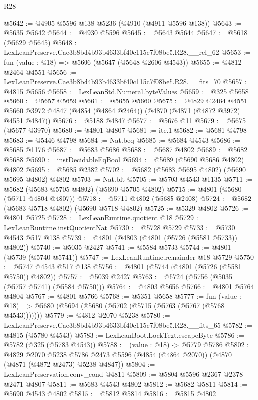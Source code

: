 \begin{lexlean}{R28}
\begin{coremodule}
@5642 := @4905 @5596 @138 @5236 (@4910 (@4911 @5596 @138))
@5643 := @5635 @5642
@5644 := @4930 @5596
@5645 := @5643 @5644
@5647 := @5618 (@5629 @5645)
@5648 := LexLeanPreserve.Cae3b8bd4b93b4633bf40c115c7f08be5.R28.__rel_62
@5653 := fun (value : @18) => @5606 (@5647 (@5648 @2606 @4543))
@5655 := @4812 @2464 @4551
@5656 := LexLeanPreserve.Cae3b8bd4b93b4633bf40c115c7f08be5.R28.__fits_70
@5657 := @4815 @5656
@5658 := LexLeanStd.Numeral.byteValues
@5659 := @325 @5658
@5660 := @5657 @5659
@5661 := @5655 @5660
@5675 := @4829
    @2464
    @4551
    @5660
    @3972
    @4847
    (@4854 (@4864 @2464))
    (@4870 (@4871 (@4872 @3972) @4551 @4847))
@5676 := @5188 @4847
@5677 := @5676 @11
@5679 := @5675 (@5677 @3970)
@5680 := @4801 @4807
@5681 := ite.{1}
@5682 := @5681 @4798
@5683 := @5446 @4798
@5684 := Nat.beq
@5685 := @5684 @4543
@5686 := @5685 @1176
@5687 := @5683 @5686
@5688 := @5687 @4802
@5689 := @5682 @5688
@5690 := instDecidableEqBool
@5694 := @5689 (@5690 @5686 @4802) @4802
@5695 := @5685 @2382
@5702 := @5682 (@5683 @5695 @4802) (@5690 @5695 @4802) @4802
@5703 := Nat.blt
@5705 := @5703 @4543 @1135
@5711 := @5682 (@5683 @5705 @4802) (@5690 @5705 @4802)
@5715 := @4801 (@5680 (@5711 @4804 @4807))
@5718 := @5711 @4802 (@5685 @2408)
@5724 := @5682 (@5683 @5718 @4802) (@5690 @5718 @4802)
@5725 := @5329 @4802
@5726 := @4801 @5725
@5728 := LexLeanRuntime.quotient @18
@5729 := LexLeanRuntime.instQuotientNat
@5730 := @5728 @5729
@5733 := @5730 @4543 @517 @138
@5739 := @4801 (@4803 (@4801 (@5726 (@5581 @5733)) @4802))
@5740 := @5035 @2427
@5741 := @5584 @5733
@5744 := @4801 (@5739 (@5740 @5741))
@5747 := LexLeanRuntime.remainder @18 @5729
@5750 := @5747 @4543 @517 @138
@5756 := @4801 (@5744 (@4801 (@5726 (@5581 @5750)) @4802))
@5757 := @5039 @2427
@5763 := @5724 (@5756 (@5035 (@5757 @5741) (@5584 @5750)))
@5764 := @4803 @5656
@5766 := @4801 @5764 @4804
@5767 := @4801 @5766
@5768 := @5351 @5658
@5777 := fun (value : @18) => @5680 (@5694 (@5680 (@5702 (@5715 (@5763 (@5767 (@5768 @4543)))))))
@5779 := @4812 @2070 @5238
@5780 := LexLeanPreserve.Cae3b8bd4b93b4633bf40c115c7f08be5.R28.__fits_65
@5782 := @4815 (@5780 @4543)
@5783 := LexLeanBoot.LockText.escapeByte
@5786 := @5782 (@325 (@5783 @4543))
@5788 := (value : @18) -> @5779 @5786
@5802 := @4829
    @2070
    @5238
    @5786
    @2473
    @5596
    (@4854 (@4864 @2070))
    (@4870 (@4871 (@4872 @2473) @5238 @4847))
@5804 := LexLeanPreservation.conv_cond @4811
@5809 := @5804 @5596 @2367 @2378 @2471 @4807
@5811 := @5683 @4543 @4802
@5812 := @5682 @5811
@5814 := @5690 @4543 @4802
@5815 := @5812 @5814
@5816 := @5815 @4802

\end{coremodule}
\end{lexlean}
